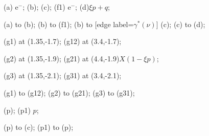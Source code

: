 \begin{feynhand}
	\vertex (a) {$\mathrm{e}^{-}$};
	\vertex [right=of a] (b);
	\vertex [below right=of b] (c);
	\vertex [above right=of b] (f1) {$\mathrm{e}^{-}$};
	\vertex [right=of c] (d){$\xi p+q$};
	

	\propag [fer, mom={$k$}] (a) to (b);
	\propag [fer, mom={$k^{\prime}$}] (b) to (f1);
	\propag [pho] (b) to [edge label=$\gamma^{*}(\nu)$] (c);
	\propag [fer] (c) to (d);

	\vertex (g1) at (1.35,-1.7);
	\vertex (g12) at (3.4,-1.7);

	\vertex (g2) at (1.35,-1.9);
	\vertex (g21) at (4.4,-1.9){$X(1-\xi p)$};

	\vertex (g3) at (1.35,-2.1);
	\vertex (g31) at (3.4,-2.1);

	\propag [fer] (g1) to (g12);
	\propag [fer] (g2) to (g21);
	\propag [fer] (g3) to (g31);

	\vertex [blob,fill=red!50!white, below=1.5cm of b] (p){};
	\vertex [left=.8cm of p] (p1) {$p$};

	\propag [fer] (p) to (c);
	\propag [fer] (p1) to (p);

\end{feynhand}

